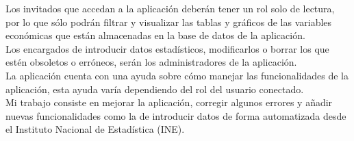Los invitados que accedan a la aplicación deberán tener un rol solo de lectura, por lo que sólo podrán filtrar y visualizar las tablas y gráficos de las variables económicas que están almacenadas en la base de datos de la aplicación.\\
Los encargados de introducir datos estadísticos, modificarlos o borrar los que estén obsoletos o erróneos, serán los administradores de la aplicación.\\
La aplicación cuenta con una ayuda sobre cómo manejar las funcionalidades de la aplicación, esta ayuda varía dependiendo del rol del usuario conectado.\\
Mi trabajo consiste en mejorar la aplicación, corregir algunos errores y añadir nuevas funcionalidades como la de introducir datos de forma automatizada desde el Instituto Nacional de Estadística (INE).\\


